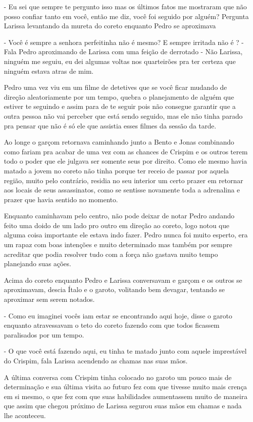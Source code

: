 - Eu sei que sempre te pergunto isso mas os últimos fatos me mostraram que não posso confiar tanto em você, então me diz, você foi seguido por alguém? Pergunta Larissa levantando da mureta do coreto enquanto Pedro se aproximava

- Você é sempre a senhora perfeitinha não é mesmo? E sempre irritada não é ? - Fala Pedro aproximando de Larissa com uma feição de derrotado  - Não Larissa, ninguém me seguiu, eu dei algumas voltas nos quarteirões pra ter certeza que ninguém estava atras de mim.

Pedro uma vez viu em um filme de detetives que se você ficar mudando de direção aleatoriamente por um tempo, quebra o planejamento de alguém que estiver te seguindo e assim para de te seguir pois não consegue garantir que a outra pessoa não vai perceber que está sendo seguido, mas ele não tinha parado pra pensar que não é só ele que assistia esses filmes da sessão da tarde.

Ao longe o garçom retornava caminhando junto a Bento e Jonas combinando como fariam pra acabar de uma vez com as chances de Crispim e os outros terem todo o poder que ele julgava ser somente seus por direito. Como ele mesmo havia matado a jovem no coreto não tinha porque ter receio de passar por aquela região, muito pelo contrário, residia no seu interior um certo prazer em retornar aos locais de seus assassinatos, como se sentisse novamente toda a adrenalina e prazer que havia sentido no momento.

Enquanto caminhavam pelo centro, não pode deixar de notar Pedro andando feito uma doido de um lado pro outro em direção ao coreto, logo notou que alguma coisa importante ele estava indo fazer. Pedro nunca foi muito esperto, era um rapaz com boas intenções e muito determinado mas também por sempre acreditar que podia resolver tudo com a força não gastava muito tempo planejando suas ações.

Acima do coreto enquanto Pedro e Larissa conversavam e garçom e os outros se aproximavam, descia Ítalo e o garoto, volitando bem devagar, tentando se aproximar sem serem notados.

- Como eu imaginei vocês iam estar se encontrando aqui hoje, disse o garoto enquanto atravessavam o teto do coreto fazendo com que todos ficassem paralisados por um tempo.

- O que você está fazendo aqui, eu tinha te matado junto com aquele imprestável do Crispim, fala Larissa acendendo as chamas nas suas mãos.

A última conversa com Crispim tinha colocado no garoto um pouco mais de determinação e sua última visita ao futuro fez com que tivesse muito mais crença em si mesmo, o que fez com que suas habilidades aumentassem muito de maneira que assim que chegou próximo de Larissa segurou suas mãos em chamas e nada lhe aconteceu.

